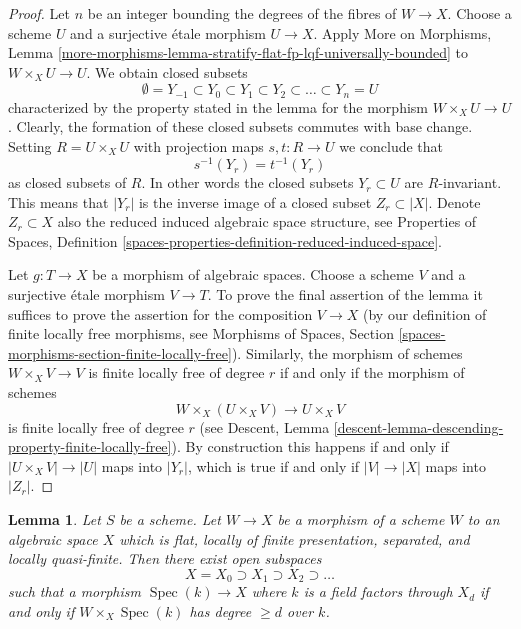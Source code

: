 \documentclass{stacks-project}
\theoremstyle{plain}
\newtheorem{lemma}[subsection]{Lemma}
\theoremstyle{definition}
\theoremstyle{remark}
\numberwithin{equation}{subsection}
\def\Spec{\mathop{\mathrm{Spec}}}
\begin{document}
\begin{proof}
Let $n$ be an integer bounding the degrees of the fibres of $W \to X$.
Choose a scheme $U$ and a surjective \'etale morphism $U \to X$.
Apply More on Morphisms, Lemma
\ref{more-morphisms-lemma-stratify-flat-fp-lqf-universally-bounded}
to $W \times_X U \to U$. We obtain closed subsets
$$
\emptyset = Y_{-1} \subset Y_0 \subset Y_1 \subset Y_2 \subset
\ldots \subset Y_n = U
$$
characterized by the property stated in the lemma for the morphism
$W \times_X U \to U$. Clearly, the formation of these closed subsets commutes
with base change. Setting $R = U \times_X U$ with projection maps
$s, t : R \to U$ we conclude that
$$
s^{-1}(Y_r) = t^{-1}(Y_r)
$$
as closed subsets of $R$. In other words the closed subsets $Y_r \subset U$
are $R$-invariant. This means that $|Y_r|$ is the inverse image of a closed
subset $Z_r \subset |X|$. Denote $Z_r \subset X$ also the reduced induced
algebraic space structure, see
Properties of Spaces, Definition
\ref{spaces-properties-definition-reduced-induced-space}.

\medskip\noindent
Let $g : T \to X$ be a morphism of algebraic spaces. Choose a scheme $V$
and a surjective \'etale morphism $V \to T$. To prove the final
assertion of the lemma it suffices to prove the assertion for the composition
$V \to X$ (by our definition of finite locally free morphisms, see
Morphisms of Spaces, Section
\ref{spaces-morphisms-section-finite-locally-free}).
Similarly, the morphism of schemes $W \times_X V \to V$ is finite
locally free of degree $r$ if and only if the morphism of schemes
$$
W \times_X (U \times_X V)
\longrightarrow
U \times_X V
$$
is finite locally free of degree $r$ (see
Descent, Lemma \ref{descent-lemma-descending-property-finite-locally-free}).
By construction this happens if and only if $|U \times_X V| \to |U|$
maps into $|Y_r|$, which is true if and only if $|V| \to |X|$ maps
into $|Z_r|$.
\end{proof}

\begin{lemma}
\label{lemma-stratify-flat-fp-lqf}
Let $S$ be a scheme. Let $W \to X$ be a morphism of a scheme $W$ to an
algebraic space $X$ which is flat, locally of finite presentation,
separated, and locally quasi-finite. Then there
exist open subspaces
$$
X = X_0 \supset X_1 \supset X_2 \supset \ldots
$$
such that a morphism $\Spec(k) \to X$ where $k$ is a field
factors through $X_d$ if and
only if $W \times_X \Spec(k)$ has degree $\geq d$ over $k$.
\end{lemma}
\end{document}
